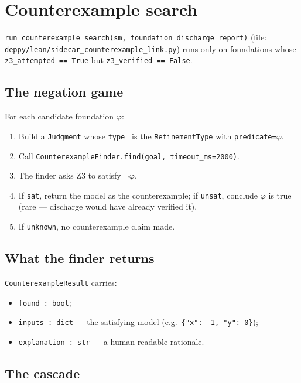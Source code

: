 \section{Counterexample search}
\label{sec:counter-search-z3}

\texttt{run\_counterexample\_search(sm,
foundation\_discharge\_report)} (file:
\texttt{deppy/lean/sidecar\_counterexample\_link.py}) runs only on
foundations whose \texttt{z3\_attempted == True} but
\texttt{z3\_verified == False}.

\subsection{The negation game}

For each candidate foundation $\varphi$:
\begin{enumerate}[leftmargin=1.7em]
  \item Build a \texttt{Judgment} whose \texttt{type\_} is the
    \texttt{RefinementType} with \texttt{predicate=}$\varphi$.
  \item Call
    \texttt{CounterexampleFinder.find(goal, timeout\_ms=2000)}.
  \item The finder asks Z3 to satisfy $\neg \varphi$.
  \item If \texttt{sat}, return the model as the counterexample;
    if \texttt{unsat}, conclude $\varphi$ is true (rare ---
    discharge would have already verified it).
  \item If \texttt{unknown}, no counterexample claim made.
\end{enumerate}

\subsection{What the finder returns}

\texttt{CounterexampleResult} carries:
\begin{itemize}[leftmargin=1.7em]
  \item \texttt{found : bool};
  \item \texttt{inputs : dict} --- the satisfying model
    (e.g.\ \verb|{"x": -1, "y": 0}|);
  \item \texttt{explanation : str} --- a human-readable rationale.
\end{itemize}

\subsection{The cascade}

